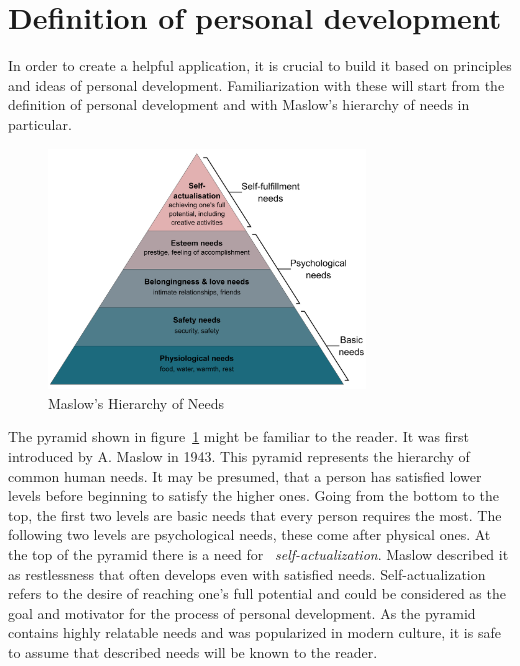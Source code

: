 
\section{Definition of personal development}\label{sec:definition-of-personal-development}

In order to create a helpful application, it is crucial to build it based on principles and ideas of personal development.
Familiarization with these will start from the definition of personal development and with Maslow's hierarchy of needs in particular.

\begin{figure}[h]
    \includegraphics[width=0.75\textwidth]{images/maslows}
    \caption{Maslow's Hierarchy of Needs~\cite{maslow-pyramid}}
    \label{fig:maslow-pyramid}
\end{figure}

The pyramid shown in figure~\ref{fig:maslow-pyramid} might be familiar to the reader.
It was first introduced by A. Maslow in 1943.\cite{maslow-motivation}
This pyramid represents the hierarchy of common human needs.
It may be presumed, that a person has satisfied lower levels before beginning to satisfy the higher ones.
Going from the bottom to the top, the first two levels are basic needs that every person requires the most.
The following two levels are psychological needs, these come after physical ones.
At the top of the pyramid there is a need for ~\textit{self-actualization}.
Maslow described it as restlessness that often develops even with satisfied needs.
Self-actualization refers to the desire of reaching one's full potential and could be considered as the goal and motivator for the process of personal development.
As the pyramid contains highly relatable needs and was popularized in modern culture, it is safe to assume that described needs will be known to the reader.

